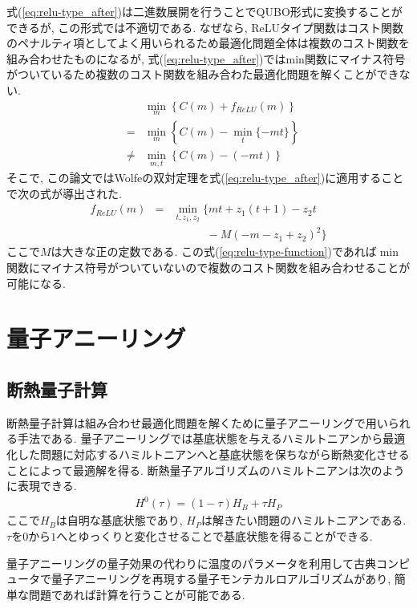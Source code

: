 \documentclass{jarticle}
\begin{document}
式(\ref{eq:relu-type_after})は二進数展開を行うことでQUBO形式に変換することができるが, この形式では不適切である. なぜなら, ReLUタイプ関数はコスト関数のペナルティ項としてよく用いられるため最適化問題全体は複数のコスト関数を組み合わせたものになるが, 式(\ref{eq:relu-type_after})ではmin関数にマイナス符号がついているため複数のコスト関数を組み合わた最適化問題を解くことができない.
\begin{eqnarray}
  &&\min_{m}{\left\{ C(m)+f_{ReLU}(m)\right\} } \nonumber \\
  &=&\min_{m}{\left\{ C(m)-\min_{t}{\{ -mt\} }\right\} } \nonumber \\
  &\neq & \min_{m,t}{\left\{ C(m)-(-mt)\right\} }
\end{eqnarray}
そこで, この論文ではWolfeの双対定理を式(\ref{eq:relu-type_after})に適用することで次の式が導出された.
\begin{eqnarray}
  f_{ReLU}(m) &=& \min_{t,z_{1},z_{2}}{\{ mt+z_{1}(t+1)-z_{2}t} \nonumber \\
    && \qquad \quad -M(-m-z_{1}+z_{2})^{2} \} \label{eq:relu-type-function}
\end{eqnarray}
ここで$M$は大きな正の定数である. この式(\ref{eq:relu-type-function})であれば$\min$関数にマイナス符号がついていないので複数のコスト関数を組み合わせることが可能になる.

\section{量子アニーリング}
\subsection{断熱量子計算}
断熱量子計算は組み合わせ最適化問題を解くために量子アニーリングで用いられる手法である. 量子アニーリングでは基底状態を与えるハミルトニアンから最適化した問題に対応するハミルトニアンへと基底状態を保ちながら断熱変化させることによって最適解を得る. 断熱量子アルゴリズムのハミルトニアンは次のように表現できる.
\begin{eqnarray}
  H^{0}(\tau)=(1-\tau)H_{B}+\tau H_{P}
\end{eqnarray}
ここで$H_{B}$は自明な基底状態であり, $H_{P}$は解きたい問題のハミルトニアンである. $\tau$を$0$から$1$へとゆっくりと変化させることで基底状態を得ることができる.

量子アニーリングの量子効果の代わりに温度のパラメータを利用して古典コンピュータで量子アニーリングを再現する量子モンテカルロアルゴリズムがあり, 簡単な問題であれば計算を行うことが可能である. 
\end{document}
